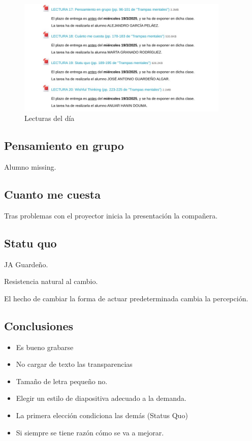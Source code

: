 \documentclass[12pt, a4paper, twoside]{article}
\begin{document}
\begin{figure}[h]
    \centering
    \includegraphics[width=0.9\textwidth]{./Images/0319.jpg}
    \caption{Lecturas del día}
\end{figure}

\subsection{Pensamiento en grupo}
Alumno missing.
\subsection{Cuanto me cuesta}
Tras problemas con el proyector inicia la presentación la compañera.
\subsection{Statu quo}
JA Guardeño.

Resistencia natural al cambio.

El hecho de cambiar la forma de actuar predeterminada cambia la percepción.

\subsection{Conclusiones}
\begin{itemize}
    \item Es bueno grabarse
    \item No cargar de texto las transparencias
    \item Tamaño de letra pequeño no.
    \item Elegir un estilo de diapositiva adecuado a la demanda.
    \item La primera elección condiciona las demás (Status Quo)
    \item Si siempre se tiene razón cómo se va a mejorar.
\end{itemize}
\end{document}
